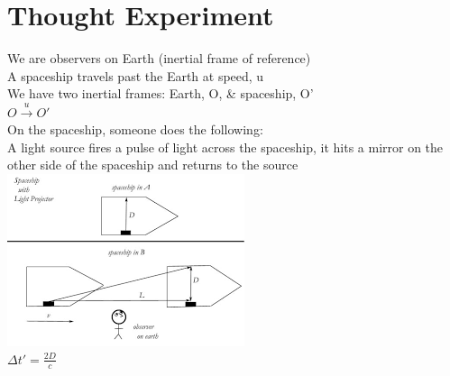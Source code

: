 \documentclass[a4paper, 11pt, fleqn, normalem]{report}
\begin{document}
\section{Thought Experiment}
We are observers on Earth (inertial frame of reference) \\
A spaceship travels past the Earth at speed, u \\
We have two inertial frames: Earth, O, \& spaceship, O' \\
$O \xrightarrow{u} O'$ \\
On the spaceship, someone does the following: \\
A light source fires a pulse of light across the spaceship, it hits a mirror on the other side of the spaceship and returns to the source \\
\includegraphics{Gamma.png} \\
$\Delta t' = \frac{2D}{c}$
\end{document}

